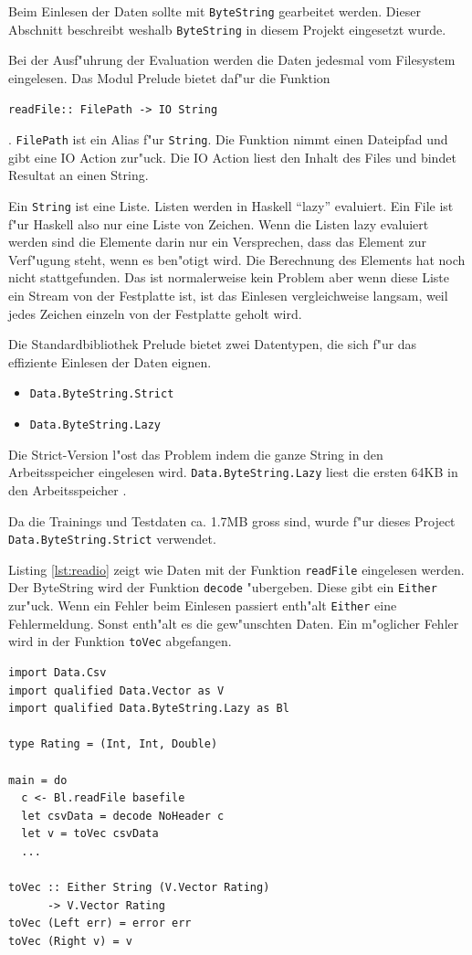 \documentclass[a4paper, 12pt]{article}
\begin{document}
Beim Einlesen der Daten sollte mit \verb|ByteString| gearbeitet werden. Dieser Abschnitt beschreibt weshalb \verb|ByteString| in diesem Projekt eingesetzt wurde.

Bei der Ausf"uhrung der Evaluation werden die Daten jedesmal vom Filesystem eingelesen. Das Modul Prelude bietet daf"ur die Funktion
\begin{verbatim}
readFile:: FilePath -> IO String
\end{verbatim}
 . \verb|FilePath| ist ein Alias f"ur \verb|String|. Die Funktion nimmt einen Dateipfad und gibt eine IO Action zur"uck. Die IO Action liest den Inhalt des Files und bindet Resultat an einen String.

Ein \verb|String| ist eine Liste. Listen werden in Haskell ``lazy'' evaluiert. Ein File ist f"ur Haskell also nur eine Liste von Zeichen. Wenn die Listen lazy evaluiert werden sind die Elemente darin nur ein Versprechen, dass das Element zur Verf"ugung steht, wenn es ben"otigt wird. Die Berechnung des Elements hat noch nicht stattgefunden. Das ist normalerweise kein Problem aber wenn diese Liste ein Stream von der Festplatte ist, ist das Einlesen vergleichweise langsam, weil jedes Zeichen einzeln von der Festplatte geholt wird.

Die Standardbibliothek Prelude bietet zwei Datentypen, die sich f"ur das effiziente Einlesen der Daten eignen.

\begin{itemize}
\item \verb|Data.ByteString.Strict|
\item \verb|Data.ByteString.Lazy|
\end{itemize}

 Die Strict-Version l"ost das Problem indem die ganze String in den Arbeitsspeicher eingelesen wird. \verb|Data.ByteString.Lazy| liest die ersten 64KB in den Arbeitsspeicher \cite{Lipovaca}.

Da die Trainings und Testdaten ca. 1.7MB gross sind, wurde f"ur dieses Project \verb|Data.ByteString.Strict| verwendet.

Listing \ref{lst:readio} zeigt wie Daten mit der Funktion \verb|readFile| eingelesen werden. Der ByteString wird der Funktion \verb|decode| "ubergeben. Diese gibt ein \verb|Either| zur"uck. Wenn ein Fehler beim Einlesen passiert enth"alt \verb|Either| eine Fehlermeldung. Sonst enth"alt es die gew"unschten Daten. Ein m"oglicher Fehler wird in der Funktion \verb|toVec| abgefangen.

\begin{lstlisting}[label={lst:readio},caption={Einlesen von Files mit ByteString}]
import Data.Csv
import qualified Data.Vector as V
import qualified Data.ByteString.Lazy as Bl

type Rating = (Int, Int, Double)

main = do
  c <- Bl.readFile basefile
  let csvData = decode NoHeader c
  let v = toVec csvData
  ...

toVec :: Either String (V.Vector Rating)
      -> V.Vector Rating
toVec (Left err) = error err
toVec (Right v) = v
\end{lstlisting}
\end{document}
